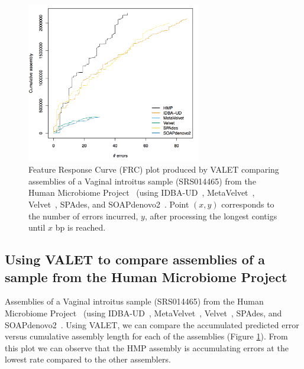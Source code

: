 \documentclass{bioinfo}
\begin{document}

\begin{figure}
\begin{center}
\includegraphics[width=3in]{figures/frc.png}
\end{center}
\caption[hmp_frc]{Feature Response Curve (FRC) plot produced by VALET comparing assemblies of a Vaginal introitus sample (SRS014465) from the Human Microbiome Project~\citep{human2012structure} (using IDBA-UD~\citep{peng2012idba}, MetaVelvet~\citep{namiki2012metavelvet}, Velvet~\citep{zerbino2008velvet}, SPAdes\citep{bankevich2012spades}, and SOAPdenovo2~\citep{luo2012soapdenovo2}. Point $(x,y)$ corresponds to the number of errors incurred, $y$, after processing the longest contigs until $x$ bp is reached.}
\label{fig:hmp_frc}
\end{figure}

\subsection{Using VALET to compare assemblies of a sample from the Human Microbiome Project}

Assemblies of a Vaginal introitus sample (SRS014465) from the Human Microbiome Project~\citep{human2012structure} (using IDBA-UD~\citep{peng2012idba}, MetaVelvet~\citep{namiki2012metavelvet}, Velvet~\citep{zerbino2008velvet}, SPAdes\citep{bankevich2012spades}, and SOAPdenovo2~\citep{luo2012soapdenovo2}.
Using VALET, we can compare the accumulated predicted error versus cumulative assembly length for each of the assemblies (Figure \ref{fig:hmp_frc}).
From this plot we can observe that the HMP assembly is accumulating errors at the lowest rate compared to the other assemblers.
\end{document}
